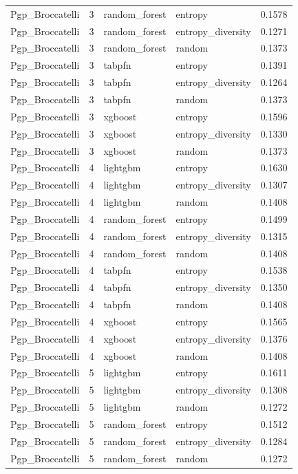\begin{tabular}{lrllr}
Pgp_Broccatelli & 3 & random_forest & entropy & 0.1578 \\
Pgp_Broccatelli & 3 & random_forest & entropy_diversity & 0.1271 \\
Pgp_Broccatelli & 3 & random_forest & random & 0.1373 \\
Pgp_Broccatelli & 3 & tabpfn & entropy & 0.1391 \\
Pgp_Broccatelli & 3 & tabpfn & entropy_diversity & 0.1264 \\
Pgp_Broccatelli & 3 & tabpfn & random & 0.1373 \\
Pgp_Broccatelli & 3 & xgboost & entropy & 0.1596 \\
Pgp_Broccatelli & 3 & xgboost & entropy_diversity & 0.1330 \\
Pgp_Broccatelli & 3 & xgboost & random & 0.1373 \\
Pgp_Broccatelli & 4 & lightgbm & entropy & 0.1630 \\
Pgp_Broccatelli & 4 & lightgbm & entropy_diversity & 0.1307 \\
Pgp_Broccatelli & 4 & lightgbm & random & 0.1408 \\
Pgp_Broccatelli & 4 & random_forest & entropy & 0.1499 \\
Pgp_Broccatelli & 4 & random_forest & entropy_diversity & 0.1315 \\
Pgp_Broccatelli & 4 & random_forest & random & 0.1408 \\
Pgp_Broccatelli & 4 & tabpfn & entropy & 0.1538 \\
Pgp_Broccatelli & 4 & tabpfn & entropy_diversity & 0.1350 \\
Pgp_Broccatelli & 4 & tabpfn & random & 0.1408 \\
Pgp_Broccatelli & 4 & xgboost & entropy & 0.1565 \\
Pgp_Broccatelli & 4 & xgboost & entropy_diversity & 0.1376 \\
Pgp_Broccatelli & 4 & xgboost & random & 0.1408 \\
Pgp_Broccatelli & 5 & lightgbm & entropy & 0.1611 \\
Pgp_Broccatelli & 5 & lightgbm & entropy_diversity & 0.1308 \\
Pgp_Broccatelli & 5 & lightgbm & random & 0.1272 \\
Pgp_Broccatelli & 5 & random_forest & entropy & 0.1512 \\
Pgp_Broccatelli & 5 & random_forest & entropy_diversity & 0.1284 \\
Pgp_Broccatelli & 5 & random_forest & random & 0.1272 \\

\end{tabular}
